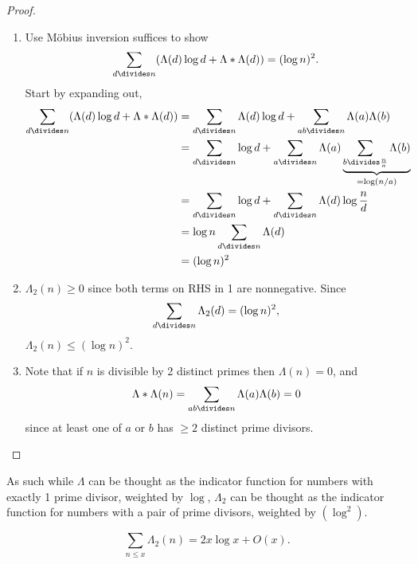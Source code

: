 \documentclass[a4paper]{article}
\begin{document}
\begin{proof}\leavevmode
  \begin{enumerate}
  \item Use Möbius inversion suffices to show
    \[
      \sum_{d \divides n} (\Lambda(d) \log d + \Lambda * \Lambda(d)) = (\log n)^2.
    \]
    Start by expanding out,
    \begin{align*}
      \sum_{d \divides n} (\Lambda(d) \log d + \Lambda * \Lambda(d))
      &= \sum_{d \divides n} \Lambda(d) \log d + \sum_{ab \divides n} \Lambda(a) \Lambda(b) \\
      &= \sum_{d \divides n} \log d + \sum_{a \divides n} \Lambda(a) \underbrace{\sum_{b \divides \frac{n}{a}} \Lambda(b)}_{= \log (n/a)} \\
      &= \sum_{d \divides n} \log d + \sum_{d \divides n} \Lambda(d) \log \frac{n}{d} \\
      &= \log n \sum_{d \divides n} \Lambda(d) \\
      &= (\log n)^2
    \end{align*}
  \item \(\Lambda_2(n) \geq 0\) since both terms on RHS in 1 are nonnegative. Since
    \[
      \sum_{d \divides n} \Lambda_2(d) = (\log n)^2,
    \]
    \(\Lambda_2(n) \leq (\log n)^2\).
  \item Note that if \(n\) is divisible by 2 distinct primes then \(\Lambda(n) = 0\), and
    \[
      \Lambda * \Lambda(n) = \sum_{ab \divides n} \Lambda(a) \Lambda(b) = 0
    \]
    since at least one of \(a\) or \(b\) has \(\geq 2\) distinct prime divisors.
  \end{enumerate}
\end{proof}

As such while \(\Lambda\) can be thought as the indicator function for numbers with exactly 1 prime divisor, weighted by \(\log\), \(\Lambda_2\) can be thought as the indicator function for numbers with a pair of prime divisors, weighted by \((\log^2)\).

\begin{theorem}[Selberg]
  \[
    \sum_{n \leq x} \Lambda_2(n) = 2x \log x + O(x).
  \]
\end{theorem}
\end{document}
